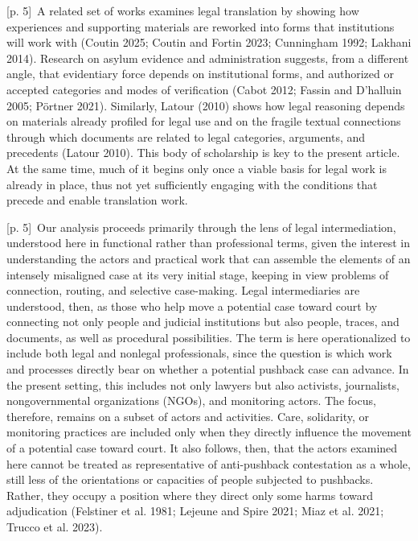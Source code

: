 \documentclass[10pt,a4paper]{article}
\begin{document}
{\scriptsize\color{gray} [p. 5]}\ A related set of works examines legal translation by showing how experiences and supporting materials are reworked into forms that institutions will work with (Coutin 2025; Coutin and Fortin 2023; Cunningham 1992; Lakhani 2014). Research on asylum evidence and administration suggests, from a different angle, that evidentiary force depends on institutional forms, and authorized or accepted categories and modes of verification (Cabot 2012; Fassin and D’halluin 2005; Pörtner 2021). Similarly, Latour (2010) shows how legal reasoning depends on materials already profiled for legal use and on the fragile textual connections through which documents are related to legal categories, arguments, and precedents (Latour 2010). This body of scholarship is key to the present article. At the same time, much of it begins only once a viable basis for legal work is already in place, thus not yet sufficiently engaging with the conditions that precede and enable translation work.\par
{\scriptsize\color{gray} [p. 5]}\ Our analysis proceeds primarily through the lens of legal intermediation, understood here in functional rather than professional terms, given the interest in understanding the actors and practical work that can assemble the elements of an intensely misaligned case at its very initial stage, keeping in view problems of connection, routing, and selective case-making. Legal intermediaries are understood, then, as those who help move a potential case toward court by connecting not only people and judicial institutions but also people, traces, and documents, as well as procedural possibilities. The term is here operationalized to include both legal and nonlegal professionals, since the question is which work and processes directly bear on whether a potential pushback case can advance. In the present setting, this includes not only lawyers but also activists, journalists, nongovernmental organizations (NGOs), and monitoring actors. The focus, therefore, remains on a subset of actors and activities. Care, solidarity, or monitoring practices are included only when they directly influence the movement of a potential case toward court. It also follows, then, that the actors examined here cannot be treated as representative of anti-pushback contestation as a whole, still less of the orientations or capacities of people subjected to pushbacks. Rather, they occupy a position where they direct only some harms toward adjudication (Felstiner et al. 1981; Lejeune and Spire 2021; Miaz et al. 2021; Trucco et al. 2023).\par
\end{document}

